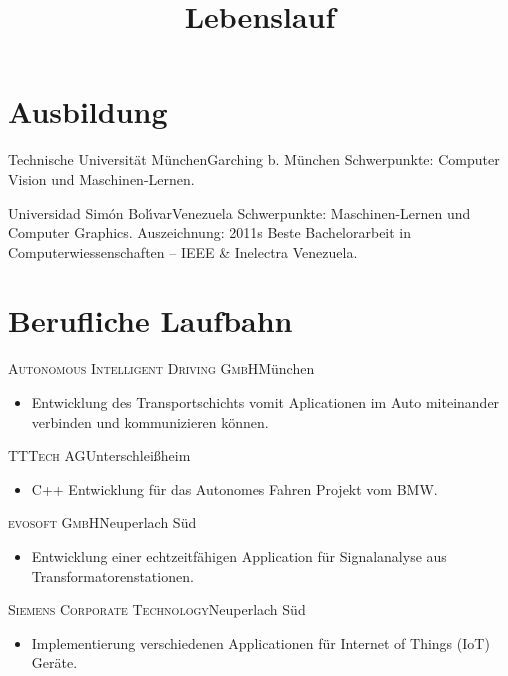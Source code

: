 \documentclass[10pt]{moderncv}
\title{Lebenslauf}
\begin{document}
\maketitle

\section{Ausbildung}

{Technische Universit\"at M\"unchen}{Garching b. M\"{u}nchen}{}{%
    Schwerpunkte: Computer Vision und Maschinen-Lernen.
  }

  {Universidad Sim\'on Bol\'{\i}var}{Venezuela}{}{%
    Schwerpunkte: Maschinen-Lernen und Computer Graphics.
    \newline
    Auszeichnung: 2011s Beste Bachelorarbeit in Computerwiessenschaften -- IEEE \& Inelectra Venezuela.
  }

\section{Berufliche Laufbahn}

{\textsc{Autonomous Intelligent Driving GmbH}}{München}{}{%
\begin{itemize}
  \item Entwicklung des Transportschichts vomit Aplicationen im Auto miteinander verbinden und kommunizieren können.
\end{itemize}
}

{\textsc{TTTech AG}}{Unterschleißheim}{}{%
\begin{itemize}
  \item C++ Entwicklung für das Autonomes Fahren Projekt vom BMW.
\end{itemize}
}

{\textsc{evosoft GmbH}}{Neuperlach S\"{u}d}{}{%
\begin{itemize}
  \item Entwicklung einer echtzeitfähigen Application für Signalanalyse aus Transformatorenstationen.
\end{itemize}
}

{\textsc{Siemens Corporate Technology}}{Neuperlach S\"{u}d}{}{%
\begin{itemize}
  \item Implementierung verschiedenen Applicationen für Internet of Things (IoT) Geräte.
\end{itemize}
}
\end{document}
